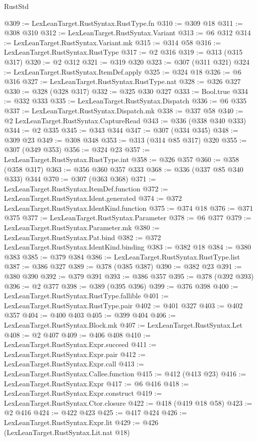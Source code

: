 \begin{lexlean}{RustStd}
\begin{coremodule}
@309 := LexLeanTarget.RustSyntax.RustType.fn
@310 := @309 @18
@311 := @308 @310
@312 := LexLeanTarget.RustSyntax.Variant
@313 := @6 @312
@314 := LexLeanTarget.RustSyntax.Variant.mk
@315 := @314 @58
@316 := LexLeanTarget.RustSyntax.RustType
@317 := @2 @316
@319 := @313 (@315 @317)
@320 := @2 @312
@321 := @319 @320
@323 := @307 (@311 @321)
@324 := LexLeanTarget.RustSyntax.ItemDef.apply
@325 := @324 @18
@326 := @6 @316
@327 := LexLeanTarget.RustSyntax.RustType.nat
@328 := @326 @327
@330 := @328 (@328 @317)
@332 := @325 @330 @327
@333 := Bool.true
@334 := @332 @333
@335 := LexLeanTarget.RustSyntax.Dispatch
@336 := @6 @335
@337 := LexLeanTarget.RustSyntax.Dispatch.mk
@338 := @337 @58
@340 := @2 LexLeanTarget.RustSyntax.CaptureRead
@343 := @336 (@338 @340 @333)
@344 := @2 @335
@345 := @343 @344
@347 := @307 (@334 @345)
@348 := @309 @23
@349 := @308 @348
@353 := @313 (@314 @85 @317) @320
@355 := @307 (@349 @353)
@356 := @324 @23
@357 := LexLeanTarget.RustSyntax.RustType.int
@358 := @326 @357
@360 := @358 (@358 @317)
@363 := @356 @360 @357 @333
@368 := @336 (@337 @85 @340 @333) @344
@370 := @307 (@363 @368)
@371 := LexLeanTarget.RustSyntax.ItemDef.function
@372 := LexLeanTarget.RustSyntax.Ident.generated
@374 := @372 LexLeanTarget.RustSyntax.IdentKind.function
@375 := @374 @18
@376 := @371 @375
@377 := LexLeanTarget.RustSyntax.Parameter
@378 := @6 @377
@379 := LexLeanTarget.RustSyntax.Parameter.mk
@380 := LexLeanTarget.RustSyntax.Pat.bind
@382 := @372 LexLeanTarget.RustSyntax.IdentKind.binding
@383 := @382 @18
@384 := @380 @383
@385 := @379 @384
@386 := LexLeanTarget.RustSyntax.RustType.list
@387 := @386 @327
@389 := @378 (@385 @387)
@390 := @382 @23
@391 := @380 @390
@392 := @379 @391
@393 := @386 @357
@395 := @378 (@392 @393)
@396 := @2 @377
@398 := @389 (@395 @396)
@399 := @376 @398
@400 := LexLeanTarget.RustSyntax.RustType.fallible
@401 := LexLeanTarget.RustSyntax.RustType.pair
@402 := @401 @327
@403 := @402 @357
@404 := @400 @403
@405 := @399 @404
@406 := LexLeanTarget.RustSyntax.Block.mk
@407 := LexLeanTarget.RustSyntax.Let
@408 := @2 @407
@409 := @406 @408
@410 := LexLeanTarget.RustSyntax.Expr.succeed
@411 := LexLeanTarget.RustSyntax.Expr.pair
@412 := LexLeanTarget.RustSyntax.Expr.call
@413 := LexLeanTarget.RustSyntax.Callee.function
@415 := @412 (@413 @23)
@416 := LexLeanTarget.RustSyntax.Expr
@417 := @6 @416
@418 := LexLeanTarget.RustSyntax.Expr.construct
@419 := LexLeanTarget.RustSyntax.Ctor.closure
@422 := @418 (@419 @18 @58)
@423 := @2 @416
@424 := @422 @423
@425 := @417 @424
@426 := LexLeanTarget.RustSyntax.Expr.lit
@429 := @426 (LexLeanTarget.RustSyntax.Lit.nat @18)

\end{coremodule}
\end{lexlean}
